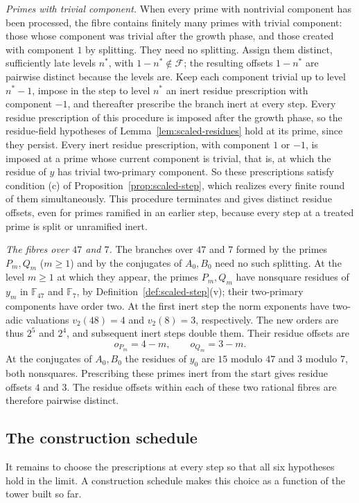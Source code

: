 \documentclass[11pt]{article}
\theoremstyle{plain}
\theoremstyle{definition}
\theoremstyle{remark}
\newcommand{\F}{\mathbb F}
\begin{document}
\emph{Primes with trivial component.}  When every prime with nontrivial
component has been processed, the fibre contains finitely many primes
with trivial component: those whose component was trivial after the
growth phase, and those created with component $1$ by splitting.  They
need no splitting.  Assign them distinct, sufficiently late levels
$n^*$, with $1-n^*\notin\mathcal F$; the resulting offsets $1-n^*$ are
pairwise distinct because the levels are.
Keep each component trivial up to level $n^*-1$, impose in the step to
level $n^*$ an inert residue prescription with component $-1$, and
thereafter prescribe
the branch inert at every step.  Every residue prescription of this
procedure is imposed after the growth phase, so the residue-field
hypotheses of Lemma~\ref{lem:scaled-residues} hold at its prime, since
they persist.  Every inert residue prescription, with component $1$ or
$-1$, is imposed at a prime whose current component is trivial, that is,
at which the residue of $y$ has trivial two-primary component.  So these
prescriptions satisfy condition (c) of Proposition~\ref{prop:scaled-step},
which realizes every finite round of them simultaneously.  This
procedure terminates and gives distinct residue offsets, even for primes
ramified in an earlier step, because every step at a treated prime is
split or unramified inert.

\emph{The fibres over $47$ and $7$.}  The branches over $47$ and $7$
formed by the primes $P_m,Q_m$ ($m\ge1$) and by the conjugates of
$A_0,B_0$ need no such splitting.  At the level $m\ge1$ at which they
appear, the primes $P_m,Q_m$ have nonsquare residues of $y_m$ in
$\F_{47}$ and $\F_7$, by Definition~\ref{def:scaled-step}(v); their
two-primary components have order two.  At the first inert step the norm
exponents have two-adic valuations $v_2(48)=4$ and $v_2(8)=3$,
respectively.  The new orders are thus $2^5$ and $2^4$, and subsequent
inert steps double them.  Their residue offsets are
\[
 o_{P_m}=4-m,\qquad o_{Q_m}=3-m.
\]
At the conjugates of $A_0,B_0$ the residues of $y_0$ are $15$ modulo
$47$ and $3$ modulo $7$, both nonsquares.  Prescribing these primes inert
from the start gives residue offsets $4$ and $3$.  The residue offsets
within each of these two rational fibres are therefore pairwise distinct.

\subsection{The construction schedule}\label{sec:schedule}
It remains to choose the prescriptions at every step so that all six
hypotheses hold in the limit.  A construction schedule makes this
choice as a function of the tower built so far.
\end{document}
